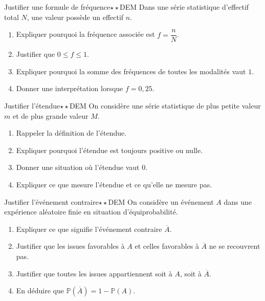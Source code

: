 \documentclass[11pt,a4paper]{article}
\newcommand{\Prob}{\mathbb{P}}
\newcounter{exo}
\begin{document}
\begin{exobox}{Justifier une formule de fréquence}{$\star\star$}{DEM}
Dans une série statistique d'effectif total $N$, une valeur possède un effectif $n$.
\begin{enumerate}
\item Expliquer pourquoi la fréquence associée est $f=\dfrac{n}{N}$.
\item Justifier que $0\leq f\leq 1$.
\item Expliquer pourquoi la somme des fréquences de toutes les modalités vaut $1$.
\item Donner une interprétation lorsque $f=0{,}25$.
\end{enumerate}
\end{exobox}

\begin{exobox}{Justifier l'étendue}{$\star\star$}{DEM}
On considère une série statistique de plus petite valeur $m$ et de plus grande valeur $M$.
\begin{enumerate}
\item Rappeler la définition de l'étendue.
\item Expliquer pourquoi l'étendue est toujours positive ou nulle.
\item Donner une situation où l'étendue vaut $0$.
\item Expliquer ce que mesure l'étendue et ce qu'elle ne mesure pas.
\end{enumerate}
\end{exobox}

\begin{exobox}{Justifier l'événement contraire}{$\star\star$}{DEM}
On considère un événement $A$ dans une expérience aléatoire finie en situation d'équiprobabilité.
\begin{enumerate}
\item Expliquer ce que signifie l'événement contraire $\overline A$.
\item Justifier que les issues favorables à $A$ et celles favorables à $\overline A$ ne se recouvrent pas.
\item Justifier que toutes les issues appartiennent soit à $A$, soit à $\overline A$.
\item En déduire que $\Prob(\overline A)=1-\Prob(A)$.
\end{enumerate}
\end{exobox}
\end{document}
